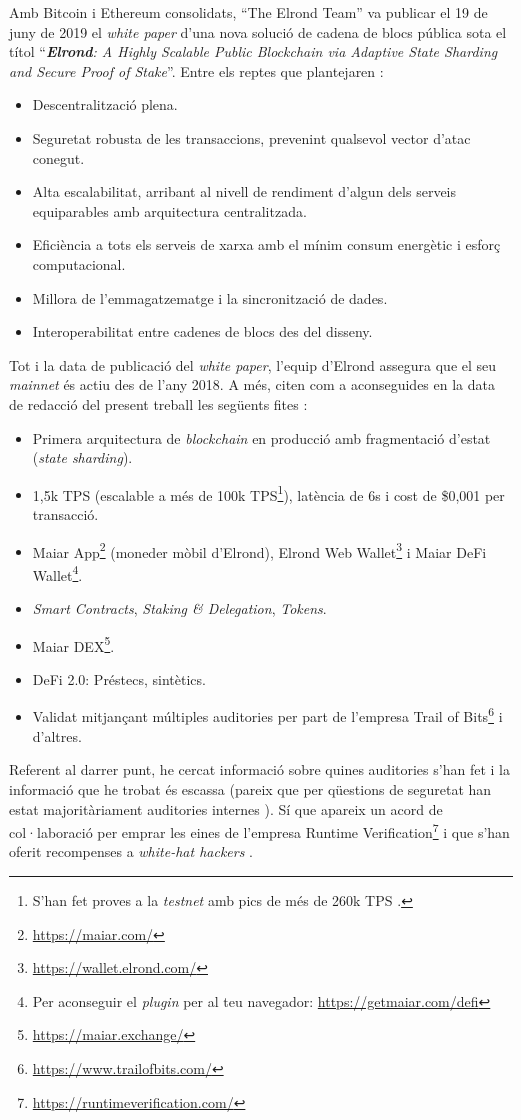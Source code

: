 \documentclass[11pt,a4paper]{article}
\begin{document}
Amb Bitcoin i Ethereum consolidats, ``The Elrond Team'' va publicar el 19 de juny de 2019 el \textit{white paper} d'una nova solució de cadena de blocs pública sota el títol ``\textit{\textbf{Elrond}: A Highly Scalable Public Blockchain via Adaptive State Sharding and Secure Proof of Stake}''. Entre els reptes que plantejaren \cite{elrond2022}\cite{elrond2019}:
\begin{itemize}
    \item Descentralització plena.
    \item Seguretat robusta de les transaccions, prevenint qualsevol vector d'atac conegut.
    \item Alta escalabilitat, arribant al nivell de rendiment d'algun dels serveis equiparables amb arquitectura centralitzada.
    \item Eficiència a tots els serveis de xarxa amb el mínim consum energètic i esforç computacional.
    \item Millora de l'emmagatzematge i la sincronització de dades.
    \item Interoperabilitat entre cadenes de blocs des del disseny.
\end{itemize}
Tot i la data de publicació del \textit{white paper}, l'equip d'Elrond assegura que el seu \textit{mainnet} és actiu des de l'any 2018. A més, citen com a aconseguides en la data de redacció del present treball les següents fites \cite{elrond2022}\cite{mincul2021}:
\begin{itemize}
    \item Primera arquitectura de \textit{blockchain} en producció amb fragmentació d'estat (\textit{state sharding}).
    \item 1,5k TPS (escalable a més de 100k TPS\footnote{S'han fet proves a la \textit{testnet} amb pics de més de 260k TPS \cite{elrond2022}.}), latència de 6s i cost de \$0,001 per transacció.
    \item Maiar App\footnote{\url{https://maiar.com/}} (moneder mòbil d'Elrond), Elrond Web Wallet\footnote{\url{https://wallet.elrond.com/}} i Maiar DeFi Wallet\footnote{Per aconseguir el \textit{plugin} per al teu navegador: \url{https://getmaiar.com/defi}}.
    \item \textit{Smart Contracts}, \textit{Staking \& Delegation}, \textit{Tokens}.
    \item Maiar DEX\footnote{\url{https://maiar.exchange/}}.
    \item DeFi 2.0: Préstecs, sintètics.
    \item Validat mitjançant múltiples auditories per part de l'empresa Trail of Bits\footnote{\url{https://www.trailofbits.com/}} i d'altres.
\end{itemize}
Referent al darrer punt, he cercat informació sobre quines auditories s'han fet i la informació que he trobat és escassa (pareix que per qüestions de seguretat han estat majoritàriament auditories internes \cite{mincub2019}). Sí que apareix un acord de col·laboració per emprar les eines de l'empresa Runtime Verification\footnote{\url{https://runtimeverification.com/}} i que s'han oferit recompenses a \textit{white-hat hackers} \cite{bounties01}\cite{mincub2021}.
\end{document}
